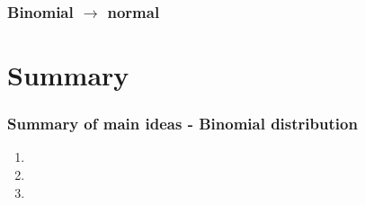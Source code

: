 \documentclass[11pt,containsverbatim,handout,xcolor=xelatex,dvipsnames,table]{beamer}
\begin{document}

 \begin{frame}
 \frametitle{Binomial $\rightarrow$ normal}

 \vfill


 \vfill

 \end{frame}


\section{Summary}


\begin{frame}
\frametitle{Summary of main ideas - Binomial distribution}

\vfill

\begin{enumerate}

\item {}

\item {}

\item {}

\end{enumerate}

\vfill

\end{frame}

\end{document}
